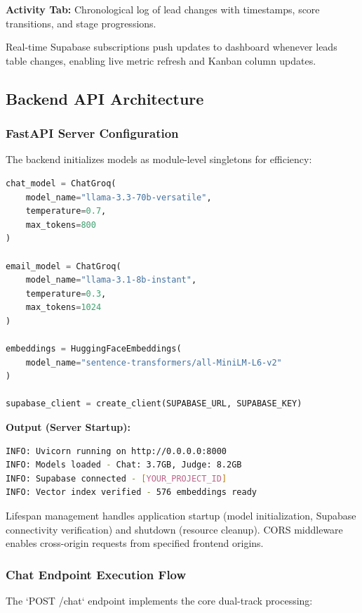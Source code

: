 \documentclass[10pt,twocolumn,a4paper]{article}
\begin{document}
\textbf{Activity Tab:} Chronological log of lead changes with timestamps, score transitions, and stage progressions.

Real-time Supabase subscriptions push updates to dashboard whenever leads table changes, enabling live metric refresh and Kanban column updates.

\subsection{Backend API Architecture}

\subsubsection{FastAPI Server Configuration}

The backend initializes models as module-level singletons for efficiency:

\begin{lstlisting}[language=Python]
chat_model = ChatGroq(
    model_name="llama-3.3-70b-versatile",
    temperature=0.7,
    max_tokens=800
)

email_model = ChatGroq(
    model_name="llama-3.1-8b-instant",
    temperature=0.3,
    max_tokens=1024
)

embeddings = HuggingFaceEmbeddings(
    model_name="sentence-transformers/all-MiniLM-L6-v2"
)

supabase_client = create_client(SUPABASE_URL, SUPABASE_KEY)
\end{lstlisting}

\textbf{Output (Server Startup):}
\begin{lstlisting}[language=bash]
INFO: Uvicorn running on http://0.0.0.0:8000
INFO: Models loaded - Chat: 3.7GB, Judge: 8.2GB
INFO: Supabase connected - [YOUR_PROJECT_ID]
INFO: Vector index verified - 576 embeddings ready
\end{lstlisting}

Lifespan management handles application startup (model initialization, Supabase connectivity verification) and shutdown (resource cleanup). CORS middleware enables cross-origin requests from specified frontend origins.

\subsubsection{Chat Endpoint Execution Flow}

The `POST /chat` endpoint implements the core dual-track processing:
\end{document}
